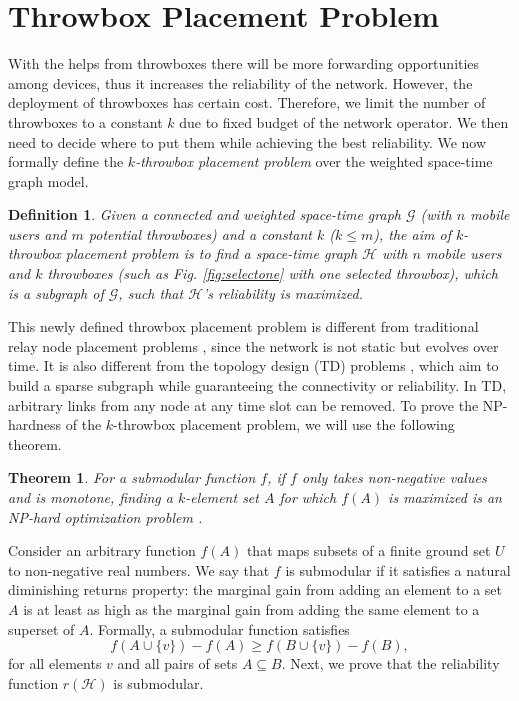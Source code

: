 \documentclass[10pt,conference,compsocconf,letterpaper]{IEEEtran}
\newtheorem{definition}{Definition}
\newtheorem{Theorem}{Theorem}
\begin{document}
\section{Throwbox Placement Problem}
\label{sec:problem}

With the helps from throwboxes there will be more forwarding opportunities among devices, thus it increases the reliability of the network. However, the deployment of throwboxes has certain cost. Therefore, we limit the number of throwboxes to a constant $k$ due to fixed budget of the network operator. We then need to decide where to put them while achieving the best reliability.  We now formally define the \emph{$k$-throwbox placement problem} over the weighted space-time graph model.

\begin{definition}
Given a connected and weighted space-time graph $\mathcal{G}$
(with $n$ mobile users and $m$ potential throwboxes) and a constant $k$ ($k \le m$), the aim of
\emph{$k$-throwbox placement problem} is to find a space-time graph $\mathcal{H}$ with $n$ mobile users and $k$ throwboxes (such as Fig. \ref{fig:selectone} with one selected throwbox), which is a subgraph of $\mathcal{G}$,
such that $\mathcal{H}$'s reliability is maximized.
\end{definition}

This newly defined throwbox placement problem is different from traditional relay node placement problems \cite{lloyd2007relay,cheng2008relay}, since the network is not static but evolves  over time.
It is also different from the topology design (TD) problems  \cite{HCZXW11-mass,HCW12-Globecom}, which aim to build a sparse subgraph while guaranteeing the connectivity or reliability. In TD, arbitrary links from any node at any time slot can be removed.
To prove the NP-hardness of the $k$-throwbox placement problem, we will use the following theorem.

\begin{Theorem}\label{theo:NP1}
For a submodular function $f$, if $f$ only takes non-negative values and is monotone,
finding a $k$-element set $A$ for which $f(A)$ is maximized is an NP-hard optimization problem \cite{cornuejols1977location,NWF78}.
\end{Theorem}

Consider an arbitrary function $f(A)$ that maps subsets of a finite ground set $U$ to non-negative real numbers.
We say that $f$ is submodular if it satisfies a natural diminishing returns property: the marginal gain from adding an
element to a set $A$ is at least as high as the marginal gain from
adding the same element to a superset of $A$. Formally, a
submodular function satisfies
\[ f(A \cup \{v\}) - f(A) \geq f(B \cup \{v\}) - f(B),\]
for all elements $v$ and all pairs of sets $A \subseteq B$. Next, we prove that the reliability function $r(\mathcal{H})$ is submodular.
\end{document}
